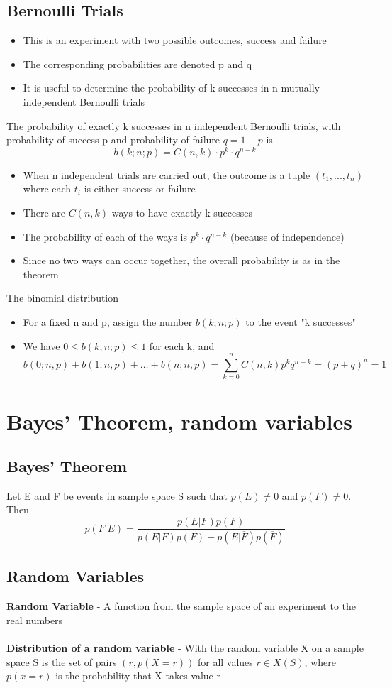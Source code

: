 \documentclass{article}[18pt]
\begin{document}
\subsection{Bernoulli Trials}
\begin{itemize}
	\item This is an experiment with two possible outcomes, success and failure
	\item The corresponding probabilities are denoted p and q
	\item It is useful to determine the probability of k successes in n mutually independent Bernoulli trials
\end{itemize}
The probability of exactly k successes in n independent Bernoulli trials, with probability of success p and probability of failure $q=1-p$ is
$$b(k;n;p)=C(n,k)\cdot p^k\cdot q^{n-k}$$
\begin{itemize}
	\item When n independent trials are carried out, the outcome is a tuple $(t_1,...,t_n)$ where each $t_i$ is either success or failure
	\item There are $C(n,k)$ ways to have exactly k successes
	\item The probability of each of the ways is $p^k\cdot q^{n-k}$ (because of independence)
	\item Since no two ways can occur together, the overall probability is as in the theorem
\end{itemize}
The binomial distribution
\begin{itemize}
	\item For a fixed n and p, assign the number $b(k;n;p)$ to the event "k successes"
	\item We have $0\leqslant b(k;n;p)\leqslant 1$ for each k, and
	$$
	b(0 ; n, p)+b(1 ; n, p)+\ldots+b(n ; n, p)=\sum_{k=0}^{n} C(n, k) p^{k} q^{n-k}=(p+q)^{n}=1
	$$
\end{itemize}
\section{Bayes' Theorem, random variables}
\subsection{Bayes' Theorem}
Let E and F be events in sample space S such that $p(E)\neq 0$ and $p(F)\neq 0$. Then
$$
p(F | E)=\frac{p(E | F) p(F)}{p(E | F) p(F)+p(E | \overline{F}) p(\overline{F})}
$$
\subsection{Random Variables}
\textbf{Random Variable} - A function from the sample space of an experiment to the real numbers\\
\\
\textbf{Distribution of a random variable} - With the random variable X on a sample space S is the set of pairs $(r,p(X=r))$ for all values $r\in X(S)$, where $p(x=r)$ is the probability that X takes value r
\end{document}
